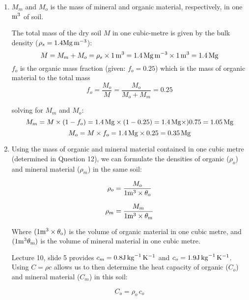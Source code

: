 \documentclass[11pt]{article}
\begin{document}
\begin{enumerate}
\item $M_m$ and $M_o$ is the mass of mineral and organic material, respectively, in one $\rm{m}^{3}$ of soil. 

The total mass of the dry soil $M$ in one cubic-metre is given by the bulk density ($\rho_s = 1.4 \rm{Mg}\,\rm{m}^{-3}$):
\begin{displaymath} 
M = M_m + M_o = \rho_s \times 1\, \rm{m}^3 = 1.4\,\rm{Mg}\,\rm{m}^{-3} \times 1\, \rm{m}^3 = 1.4\,\rm{Mg} 
\end{displaymath}
$f_o$ is the organic mass fraction (given: $f_o = 0.25$) which is the mass of organic material to the total mass
\begin{displaymath} 
f_o =  \frac{M_o}{M}  = \frac{M_o}{M_o + M_m} = 0.25
\end{displaymath}

solving for $M_m$ and $M_o$:
\begin{displaymath} 
M_m = M \times (1 - f_o) = 1.4\,\rm{Mg} \times (1 - 0.25) = 1.4\,\rm{Mg} \times) 0.75 = 1.05 \,\rm{Mg} 
\end{displaymath}
\begin{displaymath} 
M_o = M \times f_o = 1.4\,\rm{Mg} \times 0.25 = 0.35\,\rm{Mg}
\end{displaymath}


\item Using the mass of organic and mineral material contained in one cubic metre (determined in Question 12), we can formulate the densities of organic ($\rho_o$) and mineral material ($\rho_m$) in the same soil:  

\begin{displaymath} 
\rho_o = \frac{M_o}{1\rm{m}^{3} \times \theta_o} 
\end{displaymath}

\begin{displaymath} 
\rho_m = \frac{M_m}{1\rm{m}^{3} \times \theta_m}
\end{displaymath}

Where $(1\rm{m}^{3} \times \theta_o)$ is the volume of organic material in one cubic metre, and $(1\rm{m}^{3} \theta_m)$ is the volume of mineral material in one cubic metre.

Lecture 10, slide 5 provides $c_m = 0.8 \rm{J}\,\rm{kg}^{-1}\,\rm{K}^{-1}$ and  $c_o = 1.9 \rm{J}\,\rm{kg}^{-1}\,\rm{K}^{-1}$. Using $C = \rho c$ allows us to then determine the heat capacity of organic ($C_o$) and mineral material ($C_m$) in this soil:

\begin{displaymath} 
C_o = \rho_o \,c_o
\end{displaymath}


\end{enumerate}
\end{document}
